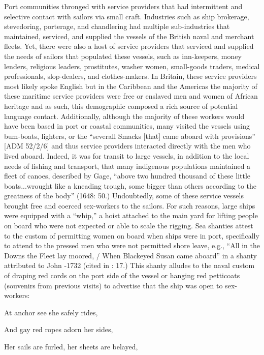 Port communities thronged with service providers that had intermittent and selective contact with sailors via small craft. Industries such as ship brokerage, stevedoring, porterage, and chandlering had multiple sub-industries that maintained, serviced, and supplied the vessels of the British naval and merchant fleets. Yet, there were also a host of service providers that serviced and supplied the needs of sailors that populated these vessels, such as inn-keepers, money lenders, religious leaders, prostitutes, washer women, small-goods traders, medical professionals, slop-dealers, and clothes-makers. In Britain, these service providers most likely spoke English but in the Caribbean and the Americas the majority of these maritime service providers were free or enslaved men and women of African heritage \citep[259]{Jarvis2010} and as such, this demographic composed a rich source of potential language contact. Additionally, although the majority of these workers would have been based in port or coastal communities, many visited the vessels using bum-boats, lighters, or the “severall Smacks [that] came aboard with provisions” [ADM 52/2/6] and thus service providers interacted directly with the men who lived aboard. Indeed, it was for transit to large vessels, in addition to the local needs of fishing and transport, that many indigenous populations maintained a fleet of canoes, described by Gage, “above two hundred thousand of these little boats...wrought like a kneading trough, some bigger than others according to the greatness of the body” (1648: 50.) Undoubtedly, some of these service vessels brought free and coerced sex-workers to the sailors. For such reasons, large ships were equipped with a “whip,” a hoist attached to the main yard for lifting people on board who were not expected or able to scale the rigging. Sea shanties attest to the custom of permitting women on board when ships were in port, specifically to attend to the pressed men who were not permitted shore leave, e.g.,  “All in the Downs the Fleet lay moored, / When Blackeyed Susan came aboard” in a shanty attributed to John \citealt{Gay1685}-1732 (cited in \citealt{Hugill1969}: 17.) This shanty alludes to the naval custom of draping red cords on the port side of the vessel or hanging red petticoats (souvenirs from previous visits) to advertise that the ship was open to sex-workers: 

At anchor see she safely rides, 

And gay red ropes adorn her sides, 

Her sails are furled, her sheets are belayed, 

